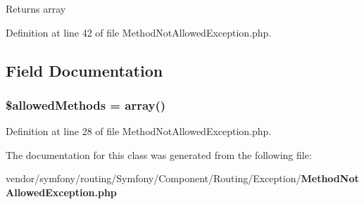 \begin{DoxyReturn}{Returns}
array 
\end{DoxyReturn}


Definition at line 42 of file Method\+Not\+Allowed\+Exception.\+php.



\subsection{Field Documentation}
\subsubsection[{\$allowed\+Methods}]{\setlength{\rightskip}{0pt plus 5cm}\$allowed\+Methods = array()\hspace{0.3cm}{\ttfamily [protected]}}\label{class_symfony_1_1_component_1_1_routing_1_1_exception_1_1_method_not_allowed_exception_ab278eba7cab5341dacdccecd7a2cc2df}


Definition at line 28 of file Method\+Not\+Allowed\+Exception.\+php.



The documentation for this class was generated from the following file\+:\begin{DoxyCompactItemize}
\item 
vendor/symfony/routing/\+Symfony/\+Component/\+Routing/\+Exception/{\bf Method\+Not\+Allowed\+Exception.\+php}\end{DoxyCompactItemize}
